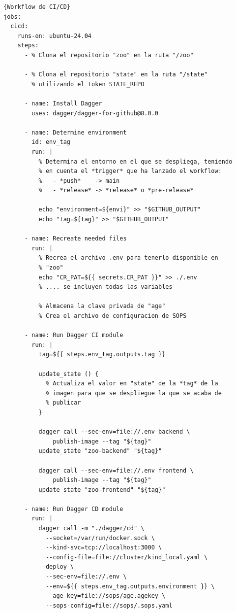 \begin{itemize}
\begin{lstlisting}[language=workflows,label=lst:workflowcicd]{Workflow de CI/CD}
jobs:
  cicd:
    runs-on: ubuntu-24.04
    steps:
      - % Clona el repositorio "zoo" en la ruta "/zoo"

      - % Clona el repositorio "state" en la ruta "/state"
        % utilizando el token STATE_REPO

      - name: Install Dagger
        uses: dagger/dagger-for-github@8.0.0

      - name: Determine environment
        id: env_tag
        run: |
          % Determina el entorno en el que se despliega, teniendo
          % en cuenta el *trigger* que ha lanzado el workflow:
          %   - *push*    -> main
          %   - *release* -> *release* o *pre-release*

          echo "environment=${envi}" >> "$GITHUB_OUTPUT"
          echo "tag=${tag}" >> "$GITHUB_OUTPUT"

      - name: Recreate needed files
        run: |
          % Recrea el archivo .env para tenerlo disponible en
          % "zoo"
          echo "CR_PAT=${{ secrets.CR_PAT }}" >> ./.env
          % .... se incluyen todas las variables

          % Almacena la clave privada de "age"
          % Crea el archivo de configuracion de SOPS

      - name: Run Dagger CI module
        run: |
          tag=${{ steps.env_tag.outputs.tag }} 

          update_state () {
            % Actualiza el valor en "state" de la *tag* de la
            % imagen para que se despliegue la que se acaba de
            % publicar
          }

          dagger call --sec-env=file://.env backend \
              publish-image --tag "${tag}"
          update_state "zoo-backend" "${tag}"

          dagger call --sec-env=file://.env frontend \
              publish-image --tag "${tag}"
          update_state "zoo-frontend" "${tag}"

      - name: Run Dagger CD module
        run: |
          dagger call -m "./dagger/cd" \
            --socket=/var/run/docker.sock \
            --kind-svc=tcp://localhost:3000 \
            --config-file=file://cluster/kind_local.yaml \
            deploy \
            --sec-env=file://.env \
            --env=${{ steps.env_tag.outputs.environment }} \
            --age-key=file://sops/age.agekey \
            --sops-config=file://sops/.sops.yaml
\end{lstlisting}


\end{itemize}
